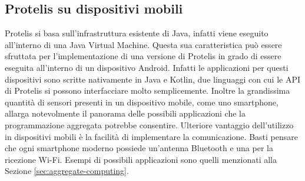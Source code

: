 \subsection{Protelis su dispositivi mobili}
Protelis si basa sull'infrastruttura esistente di Java, infatti viene eseguito
all'interno di una Java Virtual Machine. Questa sua caratteristica può essere
sfruttata per l'implementazione di una versione di Protelis in grado di essere
eseguita all'interno di un dispositivo Android. Infatti le applicazioni per
questi dispositivi sono scritte nativamente in Java e Kotlin, due linguaggi con
cui le API di Protelis si possono interfacciare molto semplicemente. Inoltre la
grandissima quantità di sensori presenti in un dispositivo mobile, come uno
smartphone, allarga notevolmente il panorama delle possibili applicazioni che la
programmazione aggregata potrebbe consentire. Ulteriore vantaggio dell'utilizzo
in dispositivi mobili è la facilità di implementare la comunicazione. Basti
pensare che ogni smartphone moderno possiede un'antenna Bluetooth e una per la
ricezione Wi-Fi. Esempi di possibili applicazioni sono quelli menzionati alla
Sezione \ref{sec:aggregate-computing}.

%

